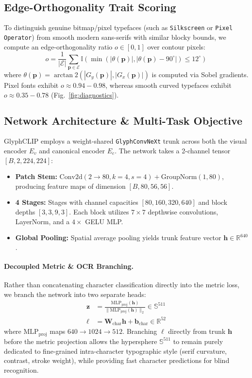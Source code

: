 \documentclass[10pt,twocolumn,letterpaper]{article}
\begin{document}
\subsection{Edge-Orthogonality Trait Scoring}
To distinguish genuine bitmap/pixel typefaces (such as \texttt{Silkscreen} or \texttt{Pixel Operator}) from smooth modern sans-serifs with similar blocky bounds, we compute an edge-orthogonality ratio $o \in [0, 1]$ over contour pixels:
\begin{equation}
    o = \frac{1}{|\mathcal{E}|} \sum_{\mathbf{p} \in \mathcal{E}} \mathbb{I}\left(\min\left(|\theta(\mathbf{p})|, |\theta(\mathbf{p}) - 90^\circ|\right) \le 12^\circ\right)
\end{equation}
where $\theta(\mathbf{p}) = \arctan2(|G_y(\mathbf{p})|, |G_x(\mathbf{p})|)$ is computed via Sobel gradients. Pixel fonts exhibit $o \approx 0.94 - 0.98$, whereas smooth curved typefaces exhibit $o \approx 0.35 - 0.78$ (Fig.~\ref{fig:diagnostics}).

\subsection{Network Architecture \& Multi-Task Objective}
GlyphCLIP employs a weight-shared \texttt{GlyphConvNeXt} trunk across both the visual encoder $E_v$ and canonical encoder $E_c$. The network takes a 2-channel tensor $[B, 2, 224, 224]$:
\begin{itemize}
    \item \textbf{Patch Stem:} $\text{Conv2d}(2 \to 80, k=4, s=4) + \text{GroupNorm}(1, 80)$, producing feature maps of dimension $[B, 80, 56, 56]$.
    \item \textbf{4 Stages:} Stages with channel capacities $[80, 160, 320, 640]$ and block depths $[3, 3, 9, 3]$. Each block utilizes $7 \times 7$ depthwise convolutions, LayerNorm, and a $4\times$ GELU MLP.
    \item \textbf{Global Pooling:} Spatial average pooling yields trunk feature vector $\mathbf{h} \in \mathbb{R}^{640}$.
\end{itemize}

\paragraph{Decoupled Metric \& OCR Branching.}
Rather than concatenating character classification directly into the metric loss, we branch the network into two separate heads:
\begin{align}
    \mathbf{z} &= \frac{\text{MLP}_{\text{proj}}(\mathbf{h})}{\|\text{MLP}_{\text{proj}}(\mathbf{h})\|_2} \in \mathbb{S}^{511} \\
    \boldsymbol{\ell} &= \mathbf{W}_{\text{char}} \mathbf{h} + \mathbf{b}_{\text{char}} \in \mathbb{R}^{52}
\end{align}
where $\text{MLP}_{\text{proj}}$ maps $640 \to 1024 \to 512$. Branching $\boldsymbol{\ell}$ directly from trunk $\mathbf{h}$ before the metric projection allows the hypersphere $\mathbb{S}^{511}$ to remain purely dedicated to fine-grained intra-character typographic style (serif curvature, contrast, stroke weight), while providing fast character predictions for blind recognition.
\end{document}

